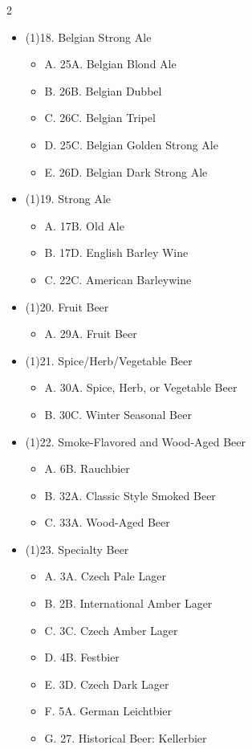 \begin{multicols*}{2}
\begin{itemize}[noitemsep]
\item[] (1)18. Belgian Strong Ale
\begin{itemize}
  \item[] A. 25A. Belgian Blond Ale
  \item[] B. 26B. Belgian Dubbel
  \item[] C. 26C. Belgian Tripel
  \item[] D. 25C. Belgian Golden Strong Ale
  \item[] E. 26D. Belgian Dark Strong Ale
\end{itemize}
\item[] (1)19. Strong Ale
\begin{itemize}
  \item[] A. 17B. Old Ale
  \item[] B. 17D. English Barley Wine
  \item[] C. 22C. American Barleywine
\end{itemize}
\item[] (1)20. Fruit Beer
\begin{itemize}
  \item[] A. 29A. Fruit Beer
\end{itemize}
\item[] (1)21. Spice/Herb/Vegetable Beer
\begin{itemize}
  \item[] A. 30A. Spice, Herb, or Vegetable Beer
  \item[] B. 30C. Winter Seasonal Beer
\end{itemize}
\item[] (1)22. Smoke-Flavored and Wood-Aged Beer
\begin{itemize}
  \item[] A. 6B. Rauchbier
  \item[] B. 32A. Classic Style Smoked Beer
  \item[] C. 33A. Wood-Aged Beer
\end{itemize}
\item[] (1)23. Specialty Beer
\begin{itemize}
  \item[] A. 3A. Czech Pale Lager
  \item[] B. 2B. International Amber Lager
  \item[] C. 3C. Czech Amber Lager
  \item[] D. 4B. Festbier
  \item[] E. 3D. Czech Dark Lager
  \item[] F. 5A. German Leichtbier
  \item[] G. 27. Historical Beer: Kellerbier

\end{itemize}
\end{itemize}
\end{multicols*}
